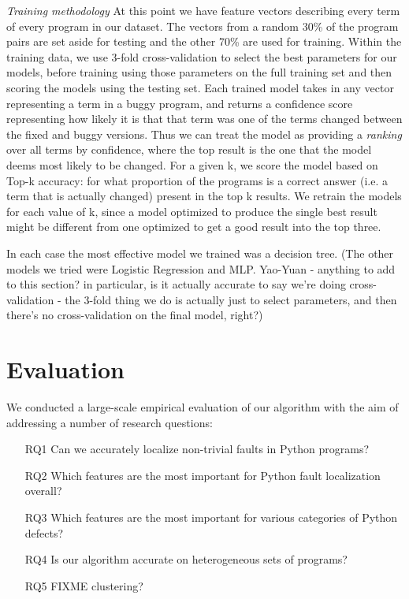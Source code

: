 \documentclass[conference]{IEEEtran}
\begin{document}
\emph{Training methodology} At this point we have feature vectors describing every term of every program in
our dataset. The vectors from a random 30\% of the program pairs are set aside for testing and
the other 70\% are used for training. Within the training data, we use 3-fold
cross-validation to select the best parameters for our models, before training
using those parameters on the full training set and then scoring the models
using the testing set. Each trained model takes in any vector representing a term
in a buggy program, and returns a confidence score representing how likely it is that
that term was one of the terms changed between the fixed and buggy versions.
Thus we can treat the model as providing a \emph{ranking} over all terms by
confidence, where the top result is the one that the model deems most likely
to be changed. For
a given k, we score the model based on Top-k accuracy: for what proportion of the
programs is a correct answer (i.e. a term that is actually changed) present in the
top k results. We retrain the models for each value of k, since a model optimized
to produce the single best result might be different from one optimized to get a
good result into the top three.

In each case the most effective model we trained was a decision tree. (The other
models we tried were Logistic Regression and MLP. Yao-Yuan - anything to add to
this section? in particular, is it actually accurate to say we're doing
cross-validation - the 3-fold thing we do is actually just to select parameters,
and then there's no cross-validation on the final model, right?)

\section{Evaluation}
\label{sec-eval}

We conducted a large-scale empirical evaluation of our algorithm with the
aim of addressing a number of research questions:
\begin{enumerate}

\item[RQ1]{Can we accurately localize non-trivial faults in Python
programs?}

\item[RQ2]{Which features are the most important for Python fault
localization overall?}

\item[RQ3]{Which features are the most important for various categories of
Python defects?}

\item[RQ4]{Is our algorithm accurate on heterogeneous sets of programs?}

\item[RQ5]{FIXME clustering?}

\end{enumerate}
\end{document}
